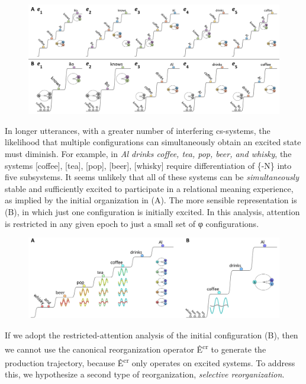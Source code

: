   
\begin{figure}
\includegraphics[width=\textwidth]{figures/Tilsen-img97.png}
\caption{\missingcaption}
\label{fig:4:47}
\end{figure}
 

  In longer utterances, with a greater number of interfering cs-systems, the likelihood that multiple configurations can simultaneously obtain an excited state must diminish. For example, in \textit{Al drinks coffee, tea, pop, beer, and whisky}, the systems [coffee], [tea], [pop], [beer], [whisky] require differentiation of \{-N\} into five subsystems. It seems unlikely that all of these systems can be \textit{simultaneously} stable and sufficiently excited to participate in a relational meaning experience, as implied by the initial organization in (A). The more sensible representation is (B), in which just one configuration is initially excited. In this analysis, attention is restricted in any given epoch to just a small set of φ configurations.

  
\begin{figure}
\includegraphics[width=\textwidth]{figures/Tilsen-img98.png}
\caption{\missingcaption}
\label{fig:4:48}
\end{figure}
 

  If we adopt the restricted-attention analysis of the initial configuration (B), then we cannot use the canonical reorganization operator Ê\textsuperscript{cr} to generate the production trajectory, because Ê\textsuperscript{cr} only operates on excited systems. To address this, we hypothesize a second type of reorganization, \textit{selective reorganization}.

